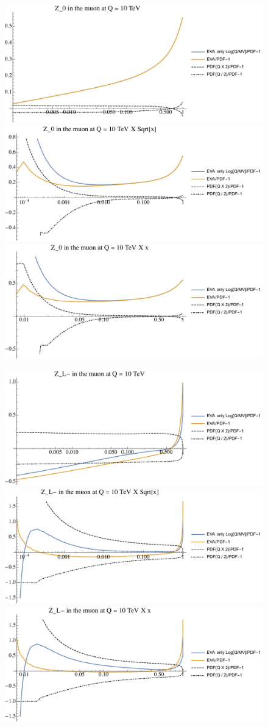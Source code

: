 \documentclass[a4paper,11pt]{article}
\begin{document}
\begin{figure}[ht]
\includegraphics[width=0.46\linewidth]{Notebooks/PlotPDFs/ratios/10TeV/Z_0_Q.pdf}
\includegraphics[width=0.46\linewidth]{Notebooks/PlotPDFs/ratios/10TeV/Z_0_Qsqrtx.pdf}
\includegraphics[width=0.46\linewidth]{Notebooks/PlotPDFs/ratios/10TeV/Z_0_Qx.pdf}
\end{figure}

\begin{figure}[ht]
\includegraphics[width=0.46\linewidth]{Notebooks/PlotPDFs/ratios/10TeV/Z_L-_Q.pdf}
\includegraphics[width=0.46\linewidth]{Notebooks/PlotPDFs/ratios/10TeV/Z_L-_Qsqrtx.pdf}
\includegraphics[width=0.46\linewidth]{Notebooks/PlotPDFs/ratios/10TeV/Z_L-_Qx.pdf}
\end{figure}
\end{document}
